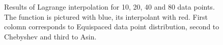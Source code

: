 \documentclass[10pt]{article}
\begin{document}
\begin{figure}[H]
\begin{minipage}[h]{0.34\linewidth}
		\end{minipage}%
		\begin{minipage}[h]{0.34\linewidth}
		\end{minipage}%
		\caption{Results of Lagrange interpolation for 10, 20, 40 and 80 data points. The function is pictured with blue, its interpolant with red. First colomn corresponds to Equispaced data point distribution, second to Chebyshev and third to Asin.}
	\end{figure}
\newpage
\end{document}
